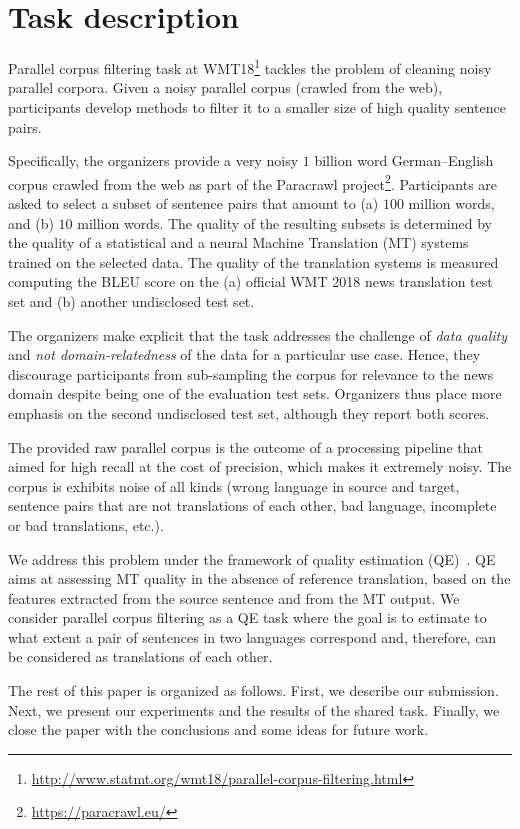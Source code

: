 \section{Task description}

Parallel corpus filtering task at WMT18\footnote{\url{http://www.statmt.org/wmt18/parallel-corpus-filtering.html}} tackles the problem of cleaning noisy parallel corpora. Given a noisy parallel corpus (crawled from the web), participants develop methods to filter it to a smaller size of high quality sentence pairs.

Specifically, the organizers provide a very noisy $1$ billion word German--English corpus crawled from the web as part of the Paracrawl project\footnote{\url{https://paracrawl.eu/}}. Participants are asked to select a subset of sentence pairs that amount to (a) $100$ million words, and (b) $10$ million words. The quality of the resulting subsets is determined by the quality of a statistical and a neural Machine Translation (MT) systems trained on the selected data. The quality of the translation systems is measured computing the BLEU score on the (a) official WMT 2018 news translation test set and (b) another undisclosed test set.

The organizers make explicit that the task addresses the challenge of \emph{data quality} and \emph{not domain-relatedness} of the data for a particular use case. Hence, they discourage participants from sub-sampling the corpus for relevance to the news domain despite being one of the evaluation test sets. Organizers thus place more emphasis on the second undisclosed test set, although they report both scores.

The provided raw parallel corpus is the outcome of a processing pipeline that aimed for high recall at the cost of precision, which makes it extremely noisy. The corpus is exhibits noise of all kinds (wrong language in source and target, sentence pairs that are not translations of each other, bad language, incomplete or bad translations, etc.).

We address this problem under the framework of quality estimation (QE)~\cite{Blatz04}. QE aims at assessing MT quality in the absence of reference translation, based on the features extracted from the source sentence and from the MT output. We consider parallel corpus filtering as a QE task where the goal is to estimate to what extent a pair of sentences in two languages correspond and, therefore, can be considered as translations of each other. 

The rest of this paper is organized as follows. First, we describe our submission. Next, we present our experiments and the results of the shared task. Finally, we close the paper with the conclusions and some ideas for future work.